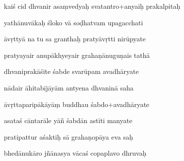 \documentclass[article,12pt,a4paper]{memoir}%
\newcounter{parCount}
\begin{document}
	  
	  \pstart \leavevmode%
	kaiś cid dhvanir asaṃvedyaḥ svatantro+anyaiḥ prakalpitaḥ 
	{}
	\pend%
      

	  
	  \pstart {} yathānuvākaḥ śloko vā soḍhatvam upagacchati 
	{}
	\pend%
      

	  
	  \pstart \leavevmode%
	āvṛttyā na tu sa granthaḥ pratyāvṛtti nirūpyate 
	{}
	\pend%
      

	  
	  \pstart {} pratyayair anupākhyeyair grahaṇānuguṇais tathā 
	{}
	\pend%
      

	  
	  \pstart \leavevmode%
	dhvaniprakāśite śabde svarūpam avadhāryate 
	{}
	\pend%
      

	  
	  \pstart {} nādair āhitabījāyām antyena dhvaninā saha 
	{}
	\pend%
      

	  
	  \pstart \leavevmode%
	āvṛttaparipākāyāṃ buddhau śabdo+avadhāryate 
	{}
	\pend%
      

	  
	  \pstart {} asataś cāntarāle yāñ śabdān astīti manyate 
	{}
	\pend%
      

	  
	  \pstart \leavevmode%
	pratipattur aśaktiḥ sā grahaṇopāya eva saḥ 
	{}
	\pend%
      

	  
	  \pstart {} bhedānukāro jñānasya vācaś copaplavo dhruvaḥ 
	{}
	\pend%
      
\end{document}
